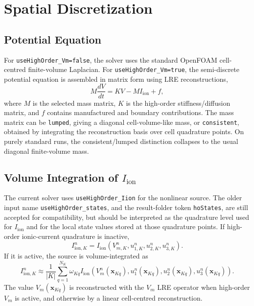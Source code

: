 \documentclass[11pt,a4paper]{article}
\newcommand{\code}[1]{\texttt{#1}}
\begin{document}
\section{Spatial Discretization}
\subsection{Potential Equation}
For \code{useHighOrder\_Vm=false}, the solver uses the standard OpenFOAM cell-centred finite-volume Laplacian. For \code{useHighOrder\_Vm=true}, the semi-discrete potential equation is assembled in matrix form using LRE reconstructions,
\begin{equation}
M\frac{dV}{dt} = K V - M I_{\mathrm{ion}} + f,
\end{equation}
where $M$ is the selected mass matrix, $K$ is the high-order stiffness/diffusion matrix, and $f$ contains manufactured and boundary contributions. The mass matrix can be \code{lumped}, giving a diagonal cell-volume-like mass, or \code{consistent}, obtained by integrating the reconstruction basis over cell quadrature points. On purely standard runs, the consistent/lumped distinction collapses to the usual diagonal finite-volume mass.

\subsection{Volume Integration of $I_{\mathrm{ion}}$}
The current solver uses \code{useHighOrder\_Iion} for the nonlinear source. The older input name \code{useHighOrder\_states}, and the result-folder token \code{hoStates}, are still accepted for compatibility, but should be interpreted as the quadrature level used for $I_{\mathrm{ion}}$ and for the local state values stored at those quadrature points.
If high-order ionic-current quadrature is inactive,
\begin{equation}
I_{\mathrm{ion},K}^n = I_{\mathrm{ion}}(V_{m,K}^n,u_{1,K}^n,u_{2,K}^n,u_{3,K}^n).
\end{equation}
If it is active, the source is volume-integrated as
\begin{equation}
I_{\mathrm{ion},K}^n
\approx \frac{1}{|K|}\sum_{q=1}^{N_K}\omega_{Kq}
I_{\mathrm{ion}}(V_m^n(\mathbf{x}_{Kq}),u_1^n(\mathbf{x}_{Kq}),u_2^n(\mathbf{x}_{Kq}),u_3^n(\mathbf{x}_{Kq})).
\end{equation}
The value $V_m(\mathbf{x}_{Kq})$ is reconstructed with the $V_m$ LRE operator when high-order $V_m$ is active, and otherwise by a linear cell-centred reconstruction.
\end{document}
